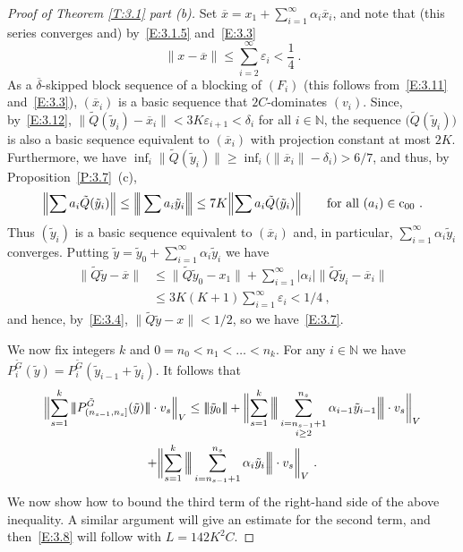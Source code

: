 \documentclass[11pt,leqno]{amsart}
\theoremstyle{definition}
\newcommand{\N}{\mathbb{N}}
\def\trivert#1{|\!|\!| #1|\!|\!|}
\def\Btrivert#1{\Big|\!\Big|\!\Big| #1\Big|\!\Big|\!\Big|}
\newcommand{\vp}{\varepsilon}
\newcommand{\coo}{\mathrm{c}_{00}}
\newcommand{\xb}{\overline{x}}
\newcommand{\norm}[1]{\lVert#1\rVert}
\newcommand{\abs}[1]{\lvert#1\rvert}
\newcommand{\Bignorm}[1]{\Bigl\lVert#1\Bigr\rVert}
\newcommand{\biggnorm}[1]{\biggl\lVert#1\biggr\rVert}
\newcommand{\deltab}{\overline\delta}
\newcommand{\yt}{\tilde y}
\newcommand{\Qt}{\tilde Q}
\newcommand{\Gt}{\tilde G}
\begin{document}
\begin{proof}[Proof of Theorem \ref{T:3.1} part (b)]
  Set $\xb=x_1+\sum_{i=1}^{\infty} \alpha_i\xb_i$, and note that (this
  series converges and) by~\eqref{E:3.1.5} and~\eqref{E:3.3}
  \begin{equation}
    \label{E:3.4}
    \norm{x-\xb}\leq\sum_{i=2}^{\infty}\vp_i<\frac14\ .
  \end{equation}
  As a $\deltab$-skipped block sequence of a blocking of $(F_i)$
  (this follows from~\eqref{E:3.11} and~\eqref{E:3.3}),
  $(\xb_i)$ is a basic sequence that $2C$-dominates $(v_i)$. Since,
  by~\eqref{E:3.12},
  $\norm{\Qt(\yt_i) -\xb_i}< 3K\vp_{i+1}<\delta_i$ for all $i\in\N$,
  the sequence $\big(\Qt(\yt_i)\big)$ is also a basic sequence
  equivalent to
  $(\xb_i)$ with projection constant at most $2K$. Furthermore, we
  have $\inf_i\norm{\Qt(\yt_i)}\geq \inf_i
  \big(\norm{\xb_i}-\delta_i\big)>6/7$, and thus, by
  Proposition~\ref{P:3.7}~(c),
  \begin{equation}
    \label{E:3.13}
    \Bignorm{\sum a_i \Qt(\yt _i)} \leq \Btrivert{\sum a_i\yt _i}
	\leq 7K \Bignorm{\sum a_i \Qt(\yt _i)}\qquad\text{for all}\
	(a_i)\in\coo\ .
  \end{equation}
  Thus $(\yt_i)$ is a basic sequence equivalent to $(\xb_i)$ and, in
  particular, $\sum_{i=1}^{\infty} \alpha_i\yt_i$ converges. Putting
  $\yt=\yt_0+\sum_{i=1}^{\infty} \alpha_i\yt_i$ we have
  \begin{align*}
    \norm{\Qt\yt-\xb} &\leq \norm{\Qt\yt_0-x_1}+ \sum_{i=1}^{\infty}
    \abs{\alpha_i}\norm{\Qt\yt_i-\xb_i}\\
    &\leq 3K(K+1)\sum_{i=1}^{\infty}\vp_i<1/4\ ,
  \end{align*}
  and hence, by~\eqref{E:3.4}, $\norm{\Qt\yt-x}<1/2$, so we
  have~\eqref{E:3.7}.

  We now fix integers $k$ and $0=n_0<n_1<\dots<n_k$. For any $i\in\N$
  we have $P^{\Gt}_i(\yt)=P^{\Gt}_i(\yt_{i-1}+\yt_i)$. It follows that
  \begin{multline}
    \label{E:3.9}
    \Bignorm{\sum_{s=1}^k\trivert{P^{\Gt}_{(n_{s-1},n_s]}(\yt)} \cdot
    v_s}_V \leq \trivert{\yt_0}+
    \biggnorm{\sum_{s=1}^k\Btrivert{\sum _{%
	  \begin{subarray}{c}
	    i=n_{s-1}+1\\
	    i\geq 2
	\end{subarray}}^{n_s}
	\alpha_{i-1}\yt_{i-1}} \cdot v_s}_V\\
    + \biggnorm{\sum_{s=1}^k\Btrivert{\sum _{i=n_{s-1}+1}^{n_s}
	\alpha_i\yt_i} \cdot v_s}_V\ .
  \end{multline}
  We now show how to bound the third term of the right-hand side of
  the above inequality. A similar argument will give an estimate for
  the second term, and then~\eqref{E:3.8} will follow with
  $L=142K^2C$.


\end{proof}
\end{document}
